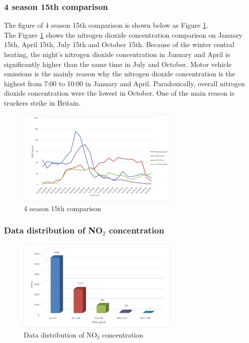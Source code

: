 \documentclass[a4paper,12pt,reqno]{article}
\begin{document}
    \subsubsection*{4 season 15th comparison}
        The figure of 4 season 15th comparison is shown below 
        as Figure \ref{fig:4_season_15th_comparison}.\\
        The Figure \ref{fig:4_season_15th_comparison} shows the nitrogen 
        dioxide concentration comparison on January 15th, April 15th, 
        July 15th and October 15th. Because of the winter central heating, 
        the night’s nitrogen dioxide concentration in January and April 
        is significantly higher than the same time in July and October. 
        Motor vehicle emissions is the mainly reason why the nitrogen 
        dioxide concentration is the highest from 7:00 to 10:00 in January 
        and April. Paradoxically, overall nitrogen dioxide concentration 
        were the lowest in October. One of the main reason is truckers 
        strike in Britain.
        \begin{figure}[H]
            \centering
            \includegraphics[width=0.7\textwidth]{figures/figure2.png}
            \caption{4 season 15th comparison}
            \label{fig:4_season_15th_comparison}
        \end{figure}

        \subsubsection*{Data distribution of NO$_2$ concentration}
        \begin{figure}[H]
            \centering
            \includegraphics[width=0.7\textwidth]{figures/figure3.png}
            \caption{Data distribution of NO$_2$ concentration}
            \label{fig:Data_distribution}
        \end{figure}
        

\newpage



\end{document}

